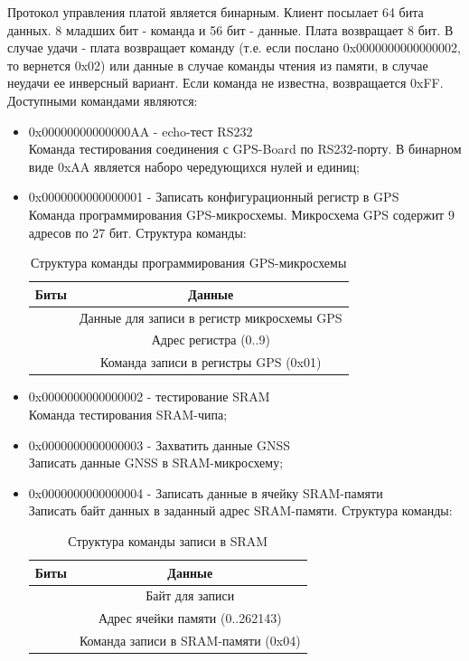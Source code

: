 Протокол управления платой является бинарным. Клиент посылает 64 бита данных.
8 младших бит - команда и 56 бит - данные. Плата возвращает 8 бит. В случае
удачи - плата возвращает команду (т.е. если послано 0x0000000000000002, то вернется 0x02) или данные в случае команды чтения из
памяти, в случае неудачи ее инверсный вариант. Если команда не известна, возвращается 0xFF.
Доступными командами являются:

\begin{itemize}
\item 0x00000000000000AA - echo-тест RS232 \\
	Команда тестирования соединения с GPS-Board по RS232-порту. В бинарном виде 0xAA является наборо чередующихся нулей и единиц;

\item 0x0000000000000001 - Записать конфигурационный регистр в GPS \\ 
	Команда программирования GPS-микросхемы. Микросхема GPS содержит 9 адресов по 27 бит. Структура команды:
	\begin{table}[H]
	\begin{center}
	\caption{Структура команды программирования GPS-микросхемы}
	\label{tab:gps_programm_comm}
	\begin{tabular}{|c|c|}
		\hline
			Биты & Данные \\
		\hline
			[39:12] & Данные для записи в регистр микросхемы GPS \\
		\hline
			[11:08] & Адрес регистра (0..9) \\
		\hline
			[07:00] & Команда записи в регистры GPS (0x01) \\
		\hline
	\end{tabular}
	\end{center}
	\end{table}

\item 0x0000000000000002 - тестирование SRAM \\ 
	Команда тестирования SRAM-чипа;

\item 0x0000000000000003 - Захватить данные GNSS \\ 
	Записать данные GNSS в SRAM-микросхему;

\item 0x0000000000000004 - Записать данные в ячейку SRAM-памяти \\ 
	Записать байт данных в заданный адрес SRAM-памяти. Структура команды:
	\begin{table}[H]
	\begin{center}
	\caption{Структура команды записи в SRAM}
	\label{tab:write_sram}
	\begin{tabular}{|c|c|}
		\hline
			Биты & Данные \\
		\hline
			[33:26] & Байт для записи \\
		\hline
			[25:08] & Адрес ячейки памяти (0..262143) \\
		\hline
			[07:00] & Команда записи в SRAM-памяти (0x04) \\
		\hline
	\end{tabular}
	\end{center}
	\end{table}


\end{itemize}

